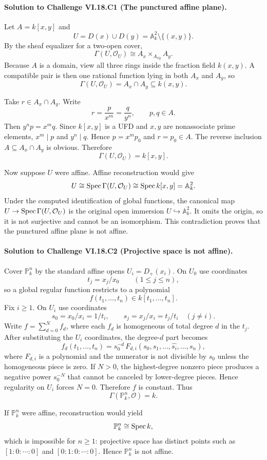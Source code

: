 
\paragraph{Solution to Challenge VI.18.C1 (The punctured affine plane).}
\begin{solution}
Let $A=k[x,y]$ and
\[
U=D(x)\cup D(y)=\mathbb A_k^2\setminus\{(x,y)\}.
\]
By the sheaf equalizer for a two-open cover,
\[
\Gamma(U,\mathcal O_U)
\cong A_x\times_{A_{xy}}A_y.
\]
Because $A$ is a domain, view all three rings inside the fraction field $k(x,y)$. A compatible pair is then one rational function lying in both $A_x$ and $A_y$, so
\[
\Gamma(U,\mathcal O_U)=A_x\cap A_y\subseteq k(x,y).
\]

Take $r\in A_x\cap A_y$. Write
\[
r=\frac{p}{x^m}=\frac{q}{y^n},\qquad p,q\in A.
\]
Then $y^np=x^mq$. Since $k[x,y]$ is a UFD and $x,y$ are nonassociate prime elements, $x^m\mid p$ and $y^n\mid q$. Hence $p=x^mp_0$ and $r=p_0\in A$. The reverse inclusion $A\subseteq A_x\cap A_y$ is obvious. Therefore
\[
\boxed{\Gamma(U,\mathcal O_U)=k[x,y].}
\]

Now suppose $U$ were affine. Affine reconstruction would give
\[
U\cong\operatorname{Spec}\Gamma(U,\mathcal O_U)\cong\operatorname{Spec} k[x,y]=\mathbb A_k^2.
\]
Under the computed identification of global functions, the canonical map $U\to\operatorname{Spec}\Gamma(U,\mathcal O_U)$ is the original open immersion $U\hookrightarrow\mathbb A_k^2$. It omits the origin, so it is not surjective and cannot be an isomorphism. This contradiction proves that the punctured affine plane is not affine.
\end{solution}

\paragraph{Solution to Challenge VI.18.C2 (Projective space is not affine).}
\begin{solution}
Cover $\mathbb P_k^n$ by the standard affine opens $U_i=D_+(x_i)$. On $U_0$ use coordinates
\[
t_j=x_j/x_0\qquad(1\le j\le n),
\]
so a global regular function restricts to a polynomial
\[
f(t_1,\dots,t_n)\in k[t_1,\dots,t_n].
\]
Fix $i\ge1$. On $U_i$ use coordinates
\[
s_0=x_0/x_i=1/t_i,
\qquad
s_j=x_j/x_i=t_j/t_i\quad(j\ne i).
\]
Write $f=\sum_{d=0}^N f_d$, where each $f_d$ is homogeneous of total degree $d$ in the $t_j$. After substituting the $U_i$ coordinates, the degree-$d$ part becomes
\[
f_d(t_1,\dots,t_n)=s_0^{-d}\,F_{d,i}(s_0,s_1,\dots,\widehat{s_i},\dots,s_n),
\]
where $F_{d,i}$ is a polynomial and the numerator is not divisible by $s_0$ unless the homogeneous piece is zero. If $N>0$, the highest-degree nonzero piece produces a negative power $s_0^{-N}$ that cannot be canceled by lower-degree pieces. Hence regularity on $U_i$ forces $N=0$. Therefore $f$ is constant. Thus
\[
\Gamma(\mathbb P_k^n,\mathcal O)=k.
\]

If $\mathbb P_k^n$ were affine, reconstruction would yield
\[
\mathbb P_k^n\cong\operatorname{Spec} k,
\]
which is impossible for $n\ge1$: projective space has distinct points such as $[1:0:\cdots:0]$ and $[0:1:0:\cdots:0]$. Hence $\mathbb P_k^n$ is not affine.
\end{solution}

